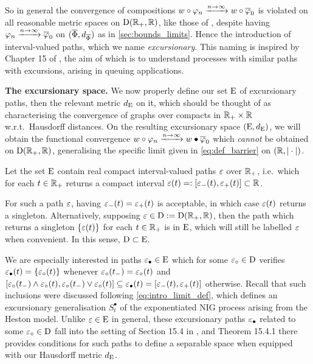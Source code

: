 So in general the convergence of compositions $w\circ\varphi_n\xrightarrow{n\to\infty}w\circ\overline{\varphi}_0$ is violated on all reasonable metric spaces on $\mathrm{D}(\mathbb{R}_+,\mathbb{R})$, like those of \cite{skorokhod_1956}, despite having $\varphi_n\xrightarrow{n\to\infty}\overline{\varphi}_0$ on $(\overline{\Phi},d_{\overline{\Phi}})$ as in \autoref{sec:bounds_limits}. Hence the introduction of interval-valued paths, which we name \emph{excursionary}. This naming is inspired by Chapter 15 of \cite{whitt_2002}, the aim of which is to understand processes with similar paths with excursions, arising in queuing applications.

\vspace{3mm}\textbf{The excursionary space.} We now properly define our set $\mathrm{E}$ of excursionary paths, then the relevant metric $d_{\mathrm{E}}$ on it, which should be thought of as characterising the convergence of graphs over compacts in $\mathbb{R}_+\times\mathbb{R}$ w.r.t.~Hausdorff distances. On the resulting excursionary space $(\mathrm{E},d_{\mathrm{E}})$, we will obtain the functional convergence $w\circ\varphi_n \xrightarrow{n\to\infty} w\bullet\overline{\varphi}_0$ which \emph{cannot} be obtained on $\mathrm{D}(\mathbb{R}_+,\mathbb{R})$, generalising the specific limit given in \autoref{eq:def_barrier} on $(\mathbb{R},|\cdot|)$.

\begin{definition}\label{def:excursionary_paths}
    Let the set $\mathrm{E}$ contain real compact interval-valued paths $\varepsilon$ over $\mathbb{R}_+$, i.e.~which for each $t\in\mathbb{R}_+$ returns a compact interval $\varepsilon(t)=:[\varepsilon_-(t),\varepsilon_+(t)]\subset\mathbb{R}$.
\end{definition}

For such a path $\varepsilon$, having $\varepsilon_-(t)=\varepsilon_+(t)$ is acceptable, in which case $\varepsilon(t)$ returns a singleton. Alternatively, supposing $\varepsilon\in\mathrm{D}:=\mathrm{D}(\mathbb{R}_+,\mathbb{R})$, then the path which returns a singleton $\{\varepsilon(t)\}$ for each $t\in\mathbb{R}_+$ is in $\mathrm{E}$, which will still be labelled $\varepsilon$ when convenient. In this sense, $\mathrm{D}\subset\mathrm{E}$.

We are especially interested in paths $\varepsilon_\bullet\in\mathrm{E}$ which for some $\varepsilon_\circ\in\mathrm{D}$ verifies $\varepsilon_\bullet(t)=\{\varepsilon_\circ(t)\}$ whenever $\varepsilon_\circ(t_-)=\varepsilon_\circ(t)$ and $[\varepsilon_\circ(t_-)\wedge \varepsilon_\circ(t),\varepsilon_\circ(t_-)\vee \varepsilon_\circ(t)]\subseteq \varepsilon_\bullet(t) = [\varepsilon_-(t),\varepsilon_+(t)]$ otherwise. Recall that such inclusions were discussed following \autoref{eq:intro_limit_def}, which defines an excursionary generalisation $S^\bullet_t$ of the exponentiated NIG process arising from the Heston model. Unlike $\varepsilon\in\mathrm{E}$ in general, these excursionary paths $\varepsilon_\bullet$ related to some $\varepsilon_\circ\in\mathrm{D}$ fall into the setting of Section 15.4 in \cite{whitt_2002}, and Theorem 15.4.1 there provides conditions for such paths to define a separable space when equipped with our Hausdorff metric $d_{\mathrm{E}}$.

